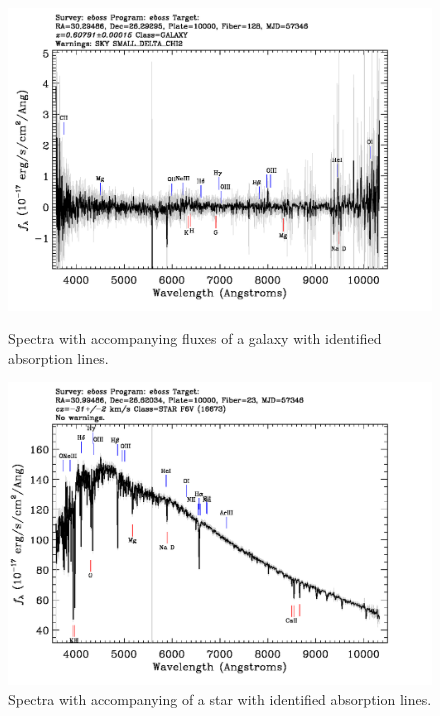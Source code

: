 \begin{figure}[H]
  \centering
    \begin{minipage}[b]{0.48\textwidth}
    \includegraphics[width=\textwidth]{figures/spectra_galaxy_1}
    \caption{Spectra with accompanying fluxes of a galaxy with identified absorption lines.}
    \label{fig:spectra_galaxy}
  \end{minipage}
  \hfill
  \begin{minipage}[b]{0.48\textwidth}
    \includegraphics[width=\textwidth]{figures/spectra_star_1}
    \caption{Spectra with accompanying of a star with identified absorption lines.}
    \label{fig:spectra_star}
  \end{minipage}
\end{figure}

